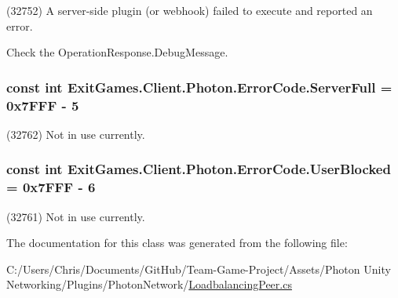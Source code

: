 (32752) A server-\/side plugin (or webhook) failed to execute and reported an error. 

Check the Operation\+Response.\+Debug\+Message. 
\subsubsection[{\texorpdfstring{Server\+Full}{ServerFull}}]{\setlength{\rightskip}{0pt plus 5cm}const int Exit\+Games.\+Client.\+Photon.\+Error\+Code.\+Server\+Full = 0x7\+F\+F\+F -\/ 5}\hypertarget{class_exit_games_1_1_client_1_1_photon_1_1_error_code_ab8516a7e5eb0152044f8befd5cc583c4}{}\label{class_exit_games_1_1_client_1_1_photon_1_1_error_code_ab8516a7e5eb0152044f8befd5cc583c4}


(32762) Not in use currently.

\subsubsection[{\texorpdfstring{User\+Blocked}{UserBlocked}}]{\setlength{\rightskip}{0pt plus 5cm}const int Exit\+Games.\+Client.\+Photon.\+Error\+Code.\+User\+Blocked = 0x7\+F\+F\+F -\/ 6}\hypertarget{class_exit_games_1_1_client_1_1_photon_1_1_error_code_af82f564f81d5a4c27f09fe60c7854fc5}{}\label{class_exit_games_1_1_client_1_1_photon_1_1_error_code_af82f564f81d5a4c27f09fe60c7854fc5}


(32761) Not in use currently.



The documentation for this class was generated from the following file\+:\begin{DoxyCompactItemize}
\item 
C\+:/\+Users/\+Chris/\+Documents/\+Git\+Hub/\+Team-\/\+Game-\/\+Project/\+Assets/\+Photon Unity Networking/\+Plugins/\+Photon\+Network/\hyperlink{_loadbalancing_peer_8cs}{Loadbalancing\+Peer.\+cs}\end{DoxyCompactItemize}
